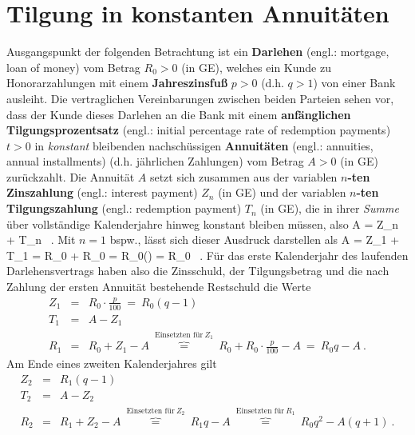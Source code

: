 \section[Tilgung in konstanten Annuit\"aten]%
{Tilgung in konstanten Annuit\"aten}
Ausgangspunkt der folgenden Betrachtung ist ein {\bf Darlehen} 
(engl.: mortgage, loan of money) vom Betrag $R_{0}>0$ (in GE), 
welches ein Kunde zu Honorarzahlungen mit einem {\bf 
Jahreszinsfu\ss} $p>0$ (d.h. $q>1$)
von einer Bank ausleiht. Die vertraglichen Vereinbarungen zwischen
beiden Parteien sehen vor, dass der Kunde dieses Darlehen an die
Bank mit einem {\bf anf\"anglichen Tilgungsprozentsatz} (engl.: 
initial percentage rate of redemption payments) $t>0$ in
{\em konstant\/} bleibenden nachsch\"ussigen {\bf Annuit\"aten}
(engl.: annuities, annual installments) (d.h. j\"ahrlichen 
Zahlungen) vom Betrag $A>0$ (in GE)
zur\"uckzahlt. Die Annuit\"at $A$ setzt sich zusammen aus der
variablen {\bf $n$-ten Zinszahlung} (engl.: interest payment) 
$Z_{n}$ (in GE) und der
variablen {\bf $n$-ten Tilgungszahlung} (engl.: redemption 
payment) $T_{n}$ (in GE), die in
ihrer {\em Summe\/} \"uber vollst\"andige Kalenderjahre hinweg
konstant bleiben m\"ussen, also
%
\be
{}
A = Z_{n} + T_{n}
\stackrel{!}{=}  \ .
\ee
%
Mit $n=1$ bspw., l\"asst sich dieser Ausdruck darstellen
als
%
\be
{}
A = Z_{1} + T_{1}
= R_{0}\cdot{} + R_{0}\cdot{}
= R_{0}\left(\right)
= R_{0}
\stackrel{!}{=}  \ .
\ee
%
F\"ur das erste Kalenderjahr des laufenden Darlehensvertrags
haben also die Zinsschuld, der Tilgungsbetrag und die nach
Zahlung der ersten Annuit\"at bestehende Restschuld die Werte
%
\begin{eqnarray*}
Z_{1} & = & R_{0}\cdot\frac{p}{100} \ = \ R_{0}(q-1) \\
%
T_{1} & = & A - Z_{1} \\
%
R_{1} & = & R_{0} + Z_{1} - A
\ \overbrace{=}^{\text{Einsetzten f\"ur}\ Z_{1}}
\ R_{0} + R_{0}\cdot\frac{p}{100} - A
\ = \ R_{0}q - A \ .
\end{eqnarray*}
%
Am Ende eines zweiten Kalenderjahres gilt
%
\begin{eqnarray*}
Z_{2} & = & R_{1}(q-1) \\
%
T_{2} & = & A - Z_{2} \\
%
R_{2} & = & R_{1} + Z_{2} - A
\ \overbrace{=}^{\text{Einsetzten f\"ur}\ Z_{2}}
\ R_{1}q - A
\ \overbrace{=}^{\text{Einsetzten f\"ur}\ R_{1}}
\ R_{0}q^{2} - A(q+1) \ .
\end{eqnarray*}
